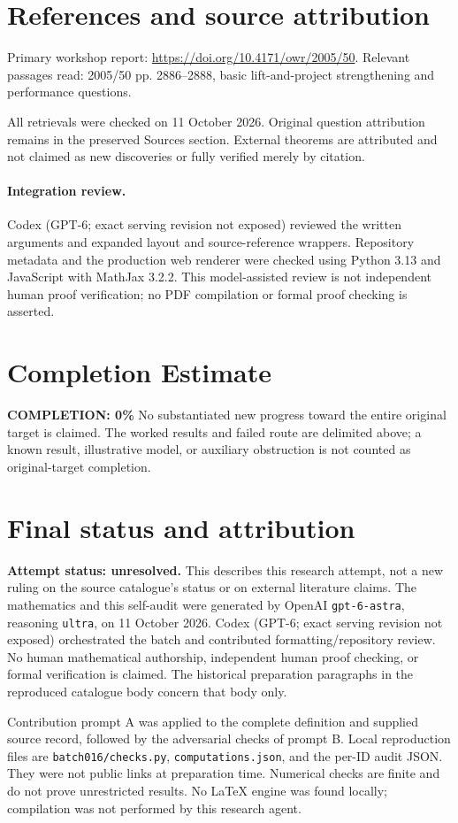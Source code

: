 \documentclass[11pt]{article}
\begin{document}
\section{References and source attribution}
Primary workshop report: \url{https://doi.org/10.4171/owr/2005/50}. Relevant passages read: 2005/50 pp. 2886--2888, basic lift-and-project strengthening and performance questions.

All retrievals were checked on 11 October 2026. Original question attribution remains in the preserved Sources section. External theorems are attributed and not claimed as new discoveries or fully verified merely by citation.


\paragraph{Integration review.} Codex (GPT-6; exact serving revision not exposed) reviewed the written arguments and expanded layout and source-reference wrappers. Repository metadata and the production web renderer were checked using Python 3.13 and JavaScript with MathJax 3.2.2. This model-assisted review is not independent human proof verification; no PDF compilation or formal proof checking is asserted.

\section{Completion Estimate}
\noindent\textbf{COMPLETION: 0\%}
No substantiated new progress toward the entire original target is claimed. The worked results and failed route are delimited above; a known result, illustrative model, or auxiliary obstruction is not counted as original-target completion.

\section{Final status and attribution}
\textbf{Attempt status: unresolved.} This describes this research attempt, not a new ruling on the source catalogue's status or on external literature claims.
The mathematics and this self-audit were generated by OpenAI \texttt{gpt-6-astra}, reasoning \texttt{ultra}, on 11 October 2026. Codex (GPT-6; exact serving revision not exposed) orchestrated the batch and contributed formatting/repository review. No human mathematical authorship, independent human proof checking, or formal verification is claimed. The historical preparation paragraphs in the reproduced catalogue body concern that body only.

Contribution prompt A was applied to the complete definition and supplied source record, followed by the adversarial checks of prompt B. Local reproduction files are \texttt{batch016/checks.py}, \texttt{computations.json}, and the per-ID audit JSON. They were not public links at preparation time. Numerical checks are finite and do not prove unrestricted results. No LaTeX engine was found locally; compilation was not performed by this research agent.
\end{document}
